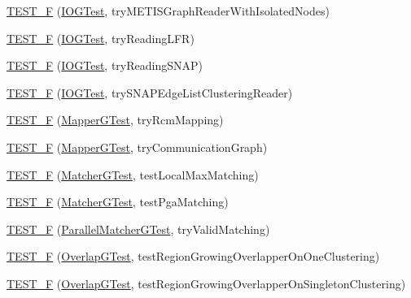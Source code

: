 \begin{DoxyCompactItemize}
\hyperlink{namespace_networ_kit_ab258fcf853cee12ee5a098470f42d8a1}{T\-E\-S\-T\-\_\-\-F} (\hyperlink{class_networ_kit_1_1_i_o_g_test}{I\-O\-G\-Test}, try\-M\-E\-T\-I\-S\-Graph\-Reader\-With\-Isolated\-Nodes)
\item 
\hyperlink{namespace_networ_kit_ab8e63e3d340ca71b32d10f518cf57900}{T\-E\-S\-T\-\_\-\-F} (\hyperlink{class_networ_kit_1_1_i_o_g_test}{I\-O\-G\-Test}, try\-Reading\-L\-F\-R)
\item 
\hyperlink{namespace_networ_kit_a05f550b1144bc09ca25e24bc7aaf53a8}{T\-E\-S\-T\-\_\-\-F} (\hyperlink{class_networ_kit_1_1_i_o_g_test}{I\-O\-G\-Test}, try\-Reading\-S\-N\-A\-P)
\item 
\hyperlink{namespace_networ_kit_aeca11d33d51450e1f35002d2ab4e0b64}{T\-E\-S\-T\-\_\-\-F} (\hyperlink{class_networ_kit_1_1_i_o_g_test}{I\-O\-G\-Test}, try\-S\-N\-A\-P\-Edge\-List\-Clustering\-Reader)
\item 
\hyperlink{namespace_networ_kit_adb5f355c50cbd2ed28cc2ad768e47a88}{T\-E\-S\-T\-\_\-\-F} (\hyperlink{class_networ_kit_1_1_mapper_g_test}{Mapper\-G\-Test}, try\-Rcm\-Mapping)
\item 
\hyperlink{namespace_networ_kit_ae880d05d897e5071b0b681c3f432cab0}{T\-E\-S\-T\-\_\-\-F} (\hyperlink{class_networ_kit_1_1_mapper_g_test}{Mapper\-G\-Test}, try\-Communication\-Graph)
\item 
\hyperlink{namespace_networ_kit_aae1cab1f68bcfaa70ab7be55c927a4ca}{T\-E\-S\-T\-\_\-\-F} (\hyperlink{class_networ_kit_1_1_matcher_g_test}{Matcher\-G\-Test}, test\-Local\-Max\-Matching)
\item 
\hyperlink{namespace_networ_kit_a15f78353fe775353dffe54bc49e742d3}{T\-E\-S\-T\-\_\-\-F} (\hyperlink{class_networ_kit_1_1_matcher_g_test}{Matcher\-G\-Test}, test\-Pga\-Matching)
\item 
\hyperlink{namespace_networ_kit_a0e760a7e4e82d6823ef5f8a18e601f8c}{T\-E\-S\-T\-\_\-\-F} (\hyperlink{class_networ_kit_1_1_parallel_matcher_g_test}{Parallel\-Matcher\-G\-Test}, try\-Valid\-Matching)
\item 
\hyperlink{namespace_networ_kit_ae7dc36fc4dfa31d3d84b0bb505655ad8}{T\-E\-S\-T\-\_\-\-F} (\hyperlink{class_networ_kit_1_1_overlap_g_test}{Overlap\-G\-Test}, test\-Region\-Growing\-Overlapper\-On\-One\-Clustering)
\item 
\hyperlink{namespace_networ_kit_a7cf6d58689907919cce6119d5a566892}{T\-E\-S\-T\-\_\-\-F} (\hyperlink{class_networ_kit_1_1_overlap_g_test}{Overlap\-G\-Test}, test\-Region\-Growing\-Overlapper\-On\-Singleton\-Clustering)
\item 

\end{DoxyCompactItemize}
